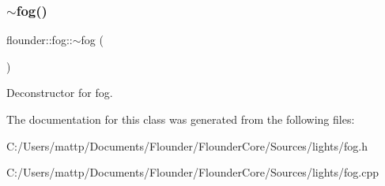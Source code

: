 \subsubsection{\texorpdfstring{$\sim$fog()}{~fog()}}
{\footnotesize\ttfamily flounder\+::fog\+::$\sim$fog (\begin{DoxyParamCaption}{ }\end{DoxyParamCaption})}



Deconstructor for fog. 



The documentation for this class was generated from the following files\+:\begin{DoxyCompactItemize}
\item 
C\+:/\+Users/mattp/\+Documents/\+Flounder/\+Flounder\+Core/\+Sources/lights/fog.\+h\item 
C\+:/\+Users/mattp/\+Documents/\+Flounder/\+Flounder\+Core/\+Sources/lights/fog.\+cpp\end{DoxyCompactItemize}
